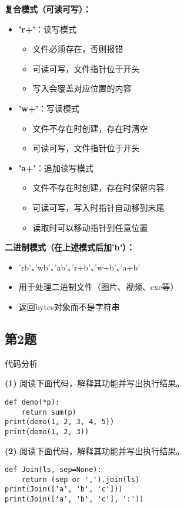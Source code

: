 \begin{mdframed}[linewidth=1pt, linecolor=black]
  \textbf{复合模式（可读可写）：}
  \begin{itemize}
    \item \textbf{'r+'}：读写模式
      \begin{itemize}
        \item 文件必须存在，否则报错
        \item 可读可写，文件指针位于开头
        \item 写入会覆盖对应位置的内容
      \end{itemize}

    \item \textbf{'w+'}：写读模式
      \begin{itemize}
        \item 文件不存在时创建，存在时清空
        \item 可读可写，文件指针位于开头
      \end{itemize}

    \item \textbf{'a+'}：追加读写模式
      \begin{itemize}
        \item 文件不存在时创建，存在时保留内容
        \item 可读可写，写入时指针自动移到末尾
        \item 读取时可以移动指针到任意位置
      \end{itemize}
  \end{itemize}

  \textbf{二进制模式（在上述模式后加'b'）：}
  \begin{itemize}
    \item 'rb'、'wb'、'ab'、'r+b'、'w+b'、'a+b'
    \item 用于处理二进制文件（图片、视频、exe等）
    \item 返回bytes对象而不是字符串
  \end{itemize}

\end{mdframed}

\subsection{第2题}
代码分析

\textbf{(1)} 阅读下面代码，解释其功能并写出执行结果。
\begin{lstlisting}
def demo(*p):
    return sum(p)
print(demo(1, 2, 3, 4, 5))
print(demo(1, 2, 3))
\end{lstlisting}

\textbf{(2)} 阅读下面代码，解释其功能并写出执行结果。
\begin{lstlisting}
def Join(ls, sep=None):
    return (sep or ',').join(ls)
print(Join(['a', 'b', 'c']))
print(Join(['a', 'b', 'c'], ':'))
\end{lstlisting}

